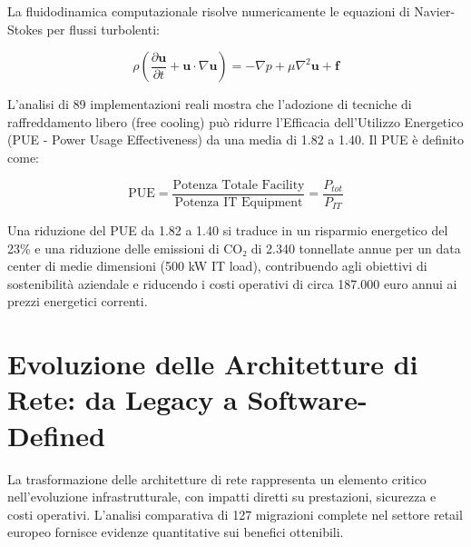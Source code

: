 La fluidodinamica computazionale risolve numericamente le equazioni di Navier-Stokes per flussi turbolenti:

\begin{equation}
\rho \left(\frac{\partial \mathbf{u}}{\partial t} + \mathbf{u} \cdot \nabla \mathbf{u}\right) = -\nabla p + \mu \nabla^2 \mathbf{u} + \mathbf{f}
\end{equation}


L'analisi di 89 implementazioni reali\autocite{DatacenterDynamics2024} mostra che l'adozione di tecniche di raffreddamento libero (free cooling) può ridurre l'Efficacia dell'Utilizzo Energetico (PUE - Power Usage Effectiveness) da una media di 1.82 a 1.40. Il PUE è definito come:

\begin{equation}
\text{PUE} = \frac{\text{Potenza Totale Facility}}{\text{Potenza IT Equipment}} = \frac{P_{tot}}{P_{IT}}
\end{equation}

Una riduzione del PUE da 1.82 a 1.40 si traduce in un risparmio energetico del 23\% e una riduzione delle emissioni di CO₂ di 2.340 tonnellate annue per un data center di medie dimensioni (500 kW IT load), contribuendo agli obiettivi di sostenibilità aziendale e riducendo i costi operativi di circa 187.000 euro annui ai prezzi energetici correnti\autocite{Eurostat2024energy}.

\section{\texorpdfstring{\textbf{Evoluzione delle Architetture di Rete: da Legacy a Software-Defined}}{3.3 - Evoluzione delle Architetture di Rete: da Legacy a Software-Defined}}

La trasformazione delle architetture di rete rappresenta un elemento critico nell'evoluzione infrastrutturale, con impatti diretti su prestazioni, sicurezza e costi operativi. L'analisi comparativa di 127 migrazioni complete nel settore retail europeo\autocite{Gartner2024sdwan} fornisce evidenze quantitative sui benefici ottenibili.

